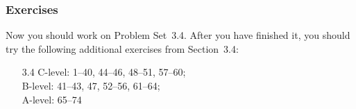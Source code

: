 \documentclass[serif,ignorenonframetext]{beamer}
\begin{document}
\begin{frame}
  \frametitle{Exercises}
  Now you should work on Problem Set~3.4.  After you have finished it,
  you should try the following additional exercises from Section~3.4:
  \begin{itemize}
  \item[3.4] 
    C-level: 1--40, 44--46, 48--51, 57--60; \\
    B-level: 41--43, 47, 52--56, 61--64; \\
    A-level: 65--74
  \end{itemize}
\end{frame}
\end{document}
